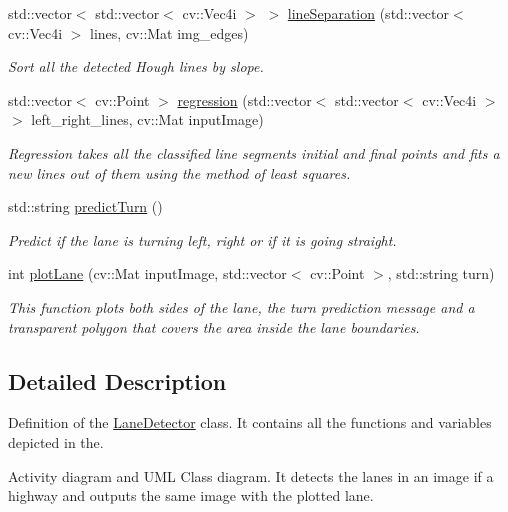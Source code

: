 \begin{DoxyCompactItemize}
std\+::vector$<$ std\+::vector$<$ cv\+::\+Vec4i $>$ $>$ \hyperlink{classLaneDetector_a8005c489f194eded3bc5a76cfc496c43}{line\+Separation} (std\+::vector$<$ cv\+::\+Vec4i $>$ lines, cv\+::\+Mat img\+\_\+edges)
\begin{DoxyCompactList}\small\item\em Sort all the detected Hough lines by slope. \end{DoxyCompactList}\item 
std\+::vector$<$ cv\+::\+Point $>$ \hyperlink{classLaneDetector_ac9a862f41a23ab0c3bfed2ce512a56d8}{regression} (std\+::vector$<$ std\+::vector$<$ cv\+::\+Vec4i $>$ $>$ left\+\_\+right\+\_\+lines, cv\+::\+Mat input\+Image)
\begin{DoxyCompactList}\small\item\em Regression takes all the classified line segments initial and final points and fits a new lines out of them using the method of least squares. \end{DoxyCompactList}\item 
std\+::string \hyperlink{classLaneDetector_a84053373ae184e752f023658fb187241}{predict\+Turn} ()
\begin{DoxyCompactList}\small\item\em Predict if the lane is turning left, right or if it is going straight. \end{DoxyCompactList}\item 
int \hyperlink{classLaneDetector_a9564c3349f0fa5a7da7968b9461e2730}{plot\+Lane} (cv\+::\+Mat input\+Image, std\+::vector$<$ cv\+::\+Point $>$, std\+::string turn)
\begin{DoxyCompactList}\small\item\em This function plots both sides of the lane, the turn prediction message and a transparent polygon that covers the area inside the lane boundaries. \end{DoxyCompactList}\end{DoxyCompactItemize}


\subsection{Detailed Description}
Definition of the \hyperlink{classLaneDetector}{Lane\+Detector} class. It contains all the functions and variables depicted in the. 

Activity diagram and U\+ML Class diagram. It detects the lanes in an image if a highway and outputs the same image with the plotted lane. 

